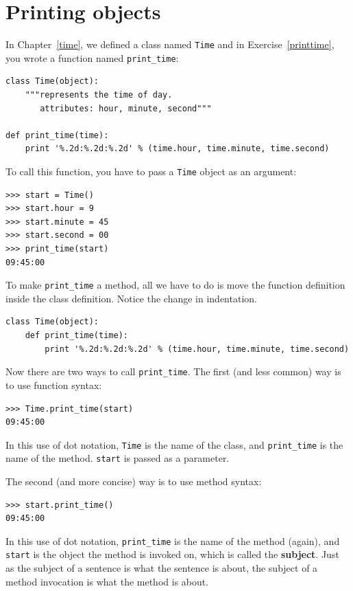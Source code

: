 \documentclass[10pt]{book}
\begin{document}
{\section{Printing objects}
\label{print_time}


In Chapter~\ref{time}, we defined a class named
{\tt Time} and in Exercise~\ref{printtime}, you 
wrote a function named \verb"print_time":

\beforeverb
\begin{verbatim}
class Time(object):
    """represents the time of day.
       attributes: hour, minute, second"""

def print_time(time):
    print '%.2d:%.2d:%.2d' % (time.hour, time.minute, time.second)
\end{verbatim}
\afterverb
%
To call this function, you have to pass a {\tt Time} object as an
argument:

\beforeverb
\begin{verbatim}
>>> start = Time()
>>> start.hour = 9
>>> start.minute = 45
>>> start.second = 00
>>> print_time(start)
09:45:00
\end{verbatim}
\afterverb
%
To make \verb"print_time" a method, all we have to do is
move the function definition inside the class definition.  Notice
the change in indentation.


\beforeverb
\begin{verbatim}
class Time(object):
    def print_time(time):
        print '%.2d:%.2d:%.2d' % (time.hour, time.minute, time.second)
\end{verbatim}
\afterverb
%
Now there are two ways to call \verb"print_time".  The first
(and less common) way is to use function syntax:



\beforeverb
\begin{verbatim}
>>> Time.print_time(start)
09:45:00
\end{verbatim}
\afterverb
%
In this use of dot notation, {\tt Time} is the name of the class,
and \verb"print_time" is the name of the method.  {\tt start} is
passed as a parameter.

The second (and more concise) way is to use method syntax:


\beforeverb
\begin{verbatim}
>>> start.print_time()
09:45:00
\end{verbatim}
\afterverb
%
In this use of dot notation, \verb"print_time" is the name of the
method (again), and {\tt start} is the object the method is
invoked on, which is called the {\bf subject}.  Just as the
subject of a sentence is what the sentence is about, the subject
of a method invocation is what the method is about.

}
\end{document}
